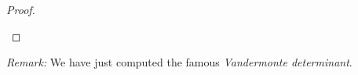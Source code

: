 \documentclass[12pt]{amsart}
\begin{document}
\begin{enumerate}
\begin{proof}
\begin{enumerate}
\end{enumerate}
\end{proof}

\emph{Remark:} We have just computed the famous \emph{Vandermonte determinant}.

\end{enumerate}
\end{document}
